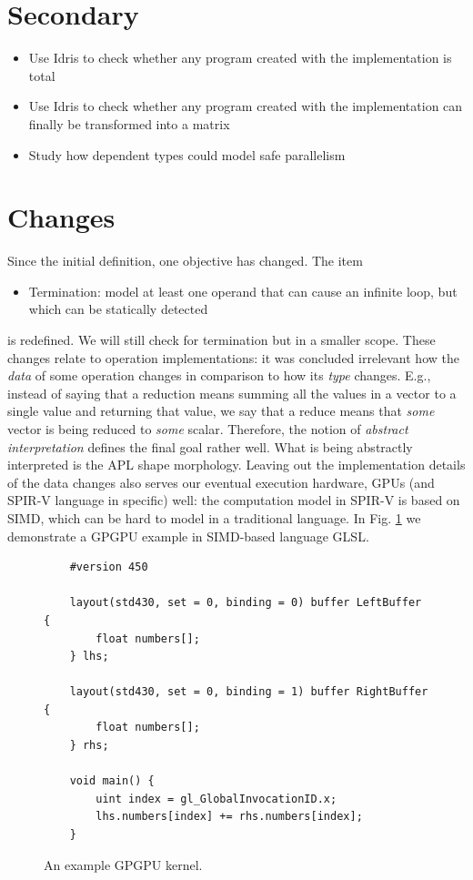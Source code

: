 \documentclass{report}
\begin{document}
\section{Secondary}

\begin{itemize}
  \item Use Idris to check whether any program created with the implementation is total
  \item Use Idris to check whether any program created with the implementation can finally be transformed into a matrix
  \item Study how dependent types could model safe parallelism
\end{itemize}

\section{Changes}

Since the initial definition, one objective has changed. The item

\begin{itemize}
  \item Termination: model at least one operand that can cause an infinite loop, but which can be statically detected
\end{itemize}

is redefined. We will still check for termination but in a smaller scope. These changes relate to operation implementations: it was concluded irrelevant how the \emph{data} of some operation changes in comparison to how its \emph{type} changes. E.g., instead of saying that a reduction means summing all the values in a vector to a single value and returning that value, we say that a reduce means that \emph{some} vector is being reduced to \emph{some} scalar. Therefore, the notion of \emph{abstract interpretation} defines the final goal rather well. What is being abstractly interpreted is the APL shape morphology. Leaving out the implementation details of the data changes also serves our eventual execution hardware, \glspl{GPU} (and SPIR-V language in specific) well: the computation model in SPIR-V is based on \gls{SIMD}, which can be hard to model in a traditional language. In Fig. \ref{fig:kernel} we demonstrate a \gls{GPGPU} example in SIMD-based language GLSL.

\begin{figure}
    \begin{lstlisting}
    #version 450
    
    layout(std430, set = 0, binding = 0) buffer LeftBuffer {
        float numbers[];
    } lhs;
    
    layout(std430, set = 0, binding = 1) buffer RightBuffer {
        float numbers[];
    } rhs;
    
    void main() {
        uint index = gl_GlobalInvocationID.x;
        lhs.numbers[index] += rhs.numbers[index];
    }    
    \end{lstlisting}
    \caption{An example GPGPU kernel.}
    \label{fig:kernel}
\end{figure}
\end{document}
